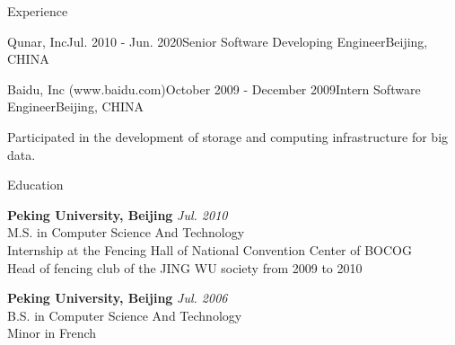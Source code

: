 \documentclass{resume} %
\begin{document}
\begin{rSection}{Experience}
\begin{rSubsection}{Qunar, Inc}{Jul. 2010 - Jun. 2020}{Senior Software Developing Engineer}{Beijing, CHINA}
  \end{rSubsection}



  \begin{rSubsection}{Baidu, Inc (www.baidu.com)}{October 2009 - December 2009}{Intern Software Engineer}{Beijing, CHINA}
  \item Participated in the development of storage and computing infrastructure for big data.
  \end{rSubsection}

\end{rSection}



\begin{rSection}{Education}

{\bf Peking University, Beijing} \hfill {\em Jul. 2010} \\ 
M.S. in Computer Science And Technology \\
Internship at the Fencing Hall of National Convention Center of BOCOG \\
Head of fencing club of the JING WU society from 2009 to 2010 

{\bf Peking University, Beijing} \hfill {\em Jul. 2006} \\ 
B.S. in Computer Science And Technology \\
Minor in French

\end{rSection}






\end{document}
